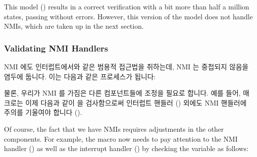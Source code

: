 
This model ()
results in a correct verification with a bit more than half a million
states, passing without errors.
However, this version of the model does not handle NMIs,
which are taken up in the next section.

\fi

\subsubsection{Validating NMI Handlers}
\label{sec:formal:Validating NMI Handlers}

NMI 에도 인터럽트에서와 같은 범용적 접근법을 취하는데, NMI 는 중첩되지 않음을
염두에 둡니다.
이는 다음과 같은  프로세스가 됩니다:

\iffalse

We take the same general approach for NMIs as we do for interrupts,
keeping in mind that NMIs do not nest.
This results in a \co{dyntick_nmi()} process as follows:

\fi



물론, 우리가 NMI 를 가짐은 다른 컴포넌트들에 조정을 필요로 합니다.
예를 들어,  매크로는 이제 다음과 같이
 을 검사함으로써 인터럽트 핸들러 ()
외에도 NMI 핸들러에 주의를 기울여야 합니다 ().

\iffalse

Of course, the fact that we have NMIs requires adjustments in
the other components.
For example, the  macro now needs to
pay attention to the NMI handler () as well
as the interrupt handler () by checking
the  variable as follows:

